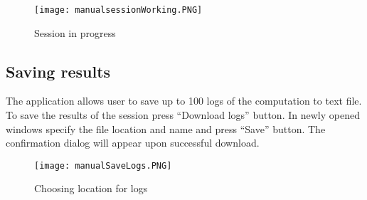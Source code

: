 \documentclass[a4paper,12pt]{article}
\begin{document}
\begin{figure}[h!]
\centering
\texttt{[image: manualsessionWorking.PNG]}\\
\caption{Session in progress}
\end{figure}

\subsection{Saving results}

The application allows user to save up to 100 logs of the computation to text file. To save the results of the session press ``Download logs'' button. In newly opened windows specify the file location and name and press ``Save'' button. The confirmation dialog will appear upon successful download.

\begin{figure}[h!]
\centering
\texttt{[image: manualSaveLogs.PNG]}\\
\caption{Choosing location for logs}
\end{figure}
\end{document}
